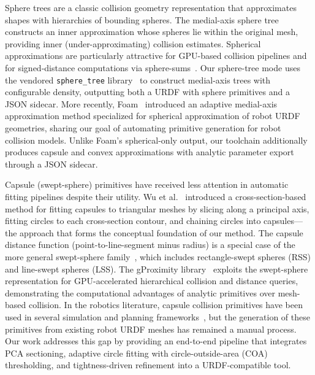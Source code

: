 Sphere trees are a classic collision geometry representation that approximates shapes with hierarchies of bounding spheres.
The medial-axis sphere tree~\cite{bradshaw2002sphere, mlund_spheretree} constructs an inner approximation whose spheres lie within the original mesh, providing inner (under-approximating) collision estimates.
Spherical approximations are particularly attractive for GPU-based collision pipelines and for signed-distance computations via sphere-sums~\cite{koptev2023neural}.
Our sphere-tree mode uses the vendored \texttt{sphere\_tree} library~\cite{mlund_spheretree} to construct medial-axis trees with configurable density, outputting both a URDF with sphere primitives and a JSON sidecar.
More recently, Foam~\cite{coumar2025foam} introduced an adaptive medial-axis approximation method specialized for spherical approximation of robot URDF geometries, sharing our goal of automating primitive generation for robot collision models. Unlike Foam's spherical-only output, our toolchain additionally produces capsule and convex approximations with analytic parameter export through a JSON sidecar.

Capsule (swept-sphere) primitives have received less attention in automatic fitting pipelines despite their utility.
Wu et al.~\cite{wu2018capsule} introduced a cross-section-based method for fitting capsules to triangular meshes by slicing along a principal axis, fitting circles to each cross-section contour, and chaining circles into capsules---the approach that forms the conceptual foundation of our method.
The capsule distance function (point-to-line-segment minus radius) is a special case of the more general swept-sphere family~\cite{larsen2000ssv}, which includes rectangle-swept spheres (RSS) and line-swept spheres (LSS).
The gProximity library~\cite{lauterbach2010gproximity} exploits the swept-sphere representation for GPU-accelerated hierarchical collision and distance queries, demonstrating the computational advantages of analytic primitives over mesh-based collision. In the robotics literature, capsule collision primitives have been used in several simulation and planning frameworks~\cite{drake}, but the generation of these primitives from existing robot URDF meshes has remained a manual process.
Our work addresses this gap by providing an end-to-end pipeline that integrates PCA sectioning, adaptive circle fitting with circle-outside-area (COA) thresholding, and tightness-driven refinement into a URDF-compatible tool.

